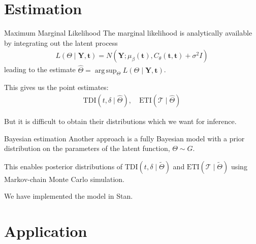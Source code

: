 \documentclass[ignorenonframetext,xcolor=pdflatex,table,dvipsnames,serif]{beamer}
\DeclareMathOperator*{\argsup}{arg\,sup}
\begin{document}
\section{Estimation}
\begin{frame}{Maximum Marginal Likelihood}
The marginal likelihood is analytically available by integrating out the latent process
\begin{align*}
  L(\Theta \mid \mathbf{Y}, \mathbf{t}) = N(\mathbf{Y}; \mu_\beta(\mathbf{t}), C_\theta(\mathbf{t}, \mathbf{t}) + \sigma^2 I)
\end{align*}
leading to the estimate $\widehat{\Theta} = \argsup_{\Theta} L(\Theta \mid \mathbf{Y}, \mathbf{t})$.

\vspace{1cm}

This gives us the \alert{point estimates}:
\begin{align*}
  \text{TDI}(t, \delta \mid \widehat{\Theta}), \quad   \text{ETI}(\mathcal{T} \mid \widehat{\Theta})
\end{align*}


But it is difficult to obtain their distributions which we want for inference.
\end{frame}




\begin{frame}{Bayesian estimation}
Another approach is a fully Bayesian model with a prior distribution on the parameters of the latent function, $\Theta \sim G$.

This enables \alert{posterior distributions} of $\text{TDI}(t, \delta \mid \widetilde{\Theta})$ and $\text{ETI}(\mathcal{T} \mid \widetilde{\Theta})$ using Markov-chain Monte Carlo simulation.

We have implemented the model in Stan.

\end{frame}



\section{Application}
\end{document}
